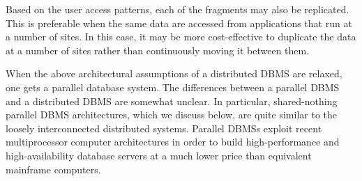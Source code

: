 \documentclass{article}
\begin{document}
Based on the user access patterns, each of the fragments may also be replicated. This is preferable when
the same data are accessed from applications that run at a number of sites. In this case, it may be more
cost-effective to duplicate the data at a number of sites rather than continuously moving it between them.

When the above architectural assumptions of a distributed DBMS are relaxed, one gets a parallel
database system. The differences between a parallel DBMS and a distributed DBMS are somewhat unclear.
In particular, shared-nothing parallel DBMS architectures, which we discuss below, are quite similar to
the loosely interconnected distributed systems. Parallel DBMSs exploit recent multiprocessor computer
architectures in order to build high-performance and high-availability database servers at a much lower price
than equivalent mainframe computers.
\end{document}

